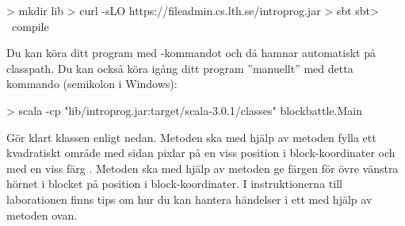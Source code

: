 \begin{REPLnonum}
> mkdir lib
> curl -sLO https://fileadmin.cs.lth.se/introprog.jar
> sbt
sbt> ~compile
\end{REPLnonum}
Du kan köra ditt program med -kommandot  och då hamnar  automatiskt på classpath. Du kan också köra igång ditt program ''manuellt'' med detta kommando (semikolon i Windows):
\begin{REPLnonum}
> scala -cp "lib/introprog.jar:target/scala-3.0.1/classes" blockbattle.Main
\end{REPLnonum}

Gör klart klassen  enligt nedan. Metoden  ska med hjälp av metoden  fylla ett kvadratiskt område med sidan  pixlar på en viss position  i block-koordinater och med en viss färg . Metoden  ska med hjälp av metoden  ge färgen för övre vänstra hörnet i blocket på position  i block-koordinater.
%
%
%
%
%
%
%
I instruktionerna till laborationen \texttt{\LabWeekSIX} finns tips om hur du kan hantera händelser i ett  med hjälp av metoden  ovan.

